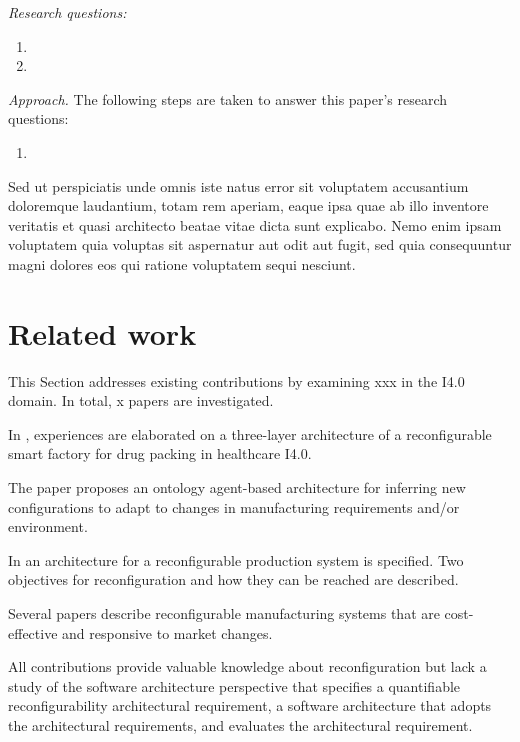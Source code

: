 \documentclass[conference]{IEEEtran}
\begin{document}
\emph{Research questions:}
\begin{enumerate}
    \item  
    \item 
\end{enumerate}

\emph{Approach.}
The following steps are taken to answer this paper's research questions: 
\begin{enumerate}
    \item 
\end{enumerate}

Sed ut perspiciatis unde omnis iste natus error sit voluptatem accusantium doloremque laudantium, totam rem aperiam, eaque ipsa quae ab illo inventore veritatis et quasi architecto beatae vitae dicta sunt explicabo. Nemo enim ipsam voluptatem quia voluptas sit aspernatur aut odit aut fugit, sed quia consequuntur magni dolores eos qui ratione voluptatem sequi nesciunt.

\section{Related work}
\label{sec:related_work}
This Section addresses existing contributions by examining xxx in the I4.0 domain. 
In total, x papers are investigated. 

In \cite{Wan2019Reconfigurable}, experiences are elaborated on a three-layer architecture of a reconfigurable smart factory for drug packing in healthcare I4.0. 

The paper \cite{Yazen2010Ontology} proposes an ontology agent-based architecture for inferring  new configurations to adapt to changes in manufacturing requirements and/or environment.

In \cite{Leitao2016Specification,Angione2017Integration} an architecture for a reconfigurable production system is specified.
Two objectives for reconfiguration and how they can be reached are described.

Several papers \cite{Koren1999Reconfigurable,Koren2010Design,Bortolini2018Reconfigurable} describe reconfigurable manufacturing systems that are cost-effective and responsive to market changes.

All contributions provide valuable knowledge about reconfiguration but lack a study of the software architecture perspective that specifies a quantifiable reconfigurability architectural requirement, a software architecture that adopts the architectural requirements, and evaluates the architectural requirement. 
\end{document}
